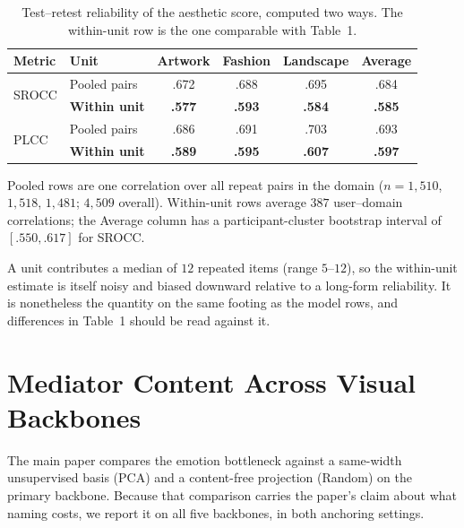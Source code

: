 \begin{table}[t]
\centering
\begin{threeparttable}
\caption{Test--retest reliability of the aesthetic score, computed two ways.
The within-unit row is the one comparable with Table~1.}
\label{tab:retest_units}
\small
\setlength{\tabcolsep}{4.5pt}
\begin{tabular}{llcccc}
\toprule
Metric & Unit & Artwork & Fashion & Landscape & Average \\
\midrule
\multirow{2}{*}{SROCC}
 & Pooled pairs      & .672 & .688 & .695 & .684 \\
 & \textbf{Within unit} & \textbf{.577} & \textbf{.593} & \textbf{.584} & \textbf{.585} \\
\midrule
\multirow{2}{*}{PLCC}
 & Pooled pairs      & .686 & .691 & .703 & .693 \\
 & \textbf{Within unit} & \textbf{.589} & \textbf{.595} & \textbf{.607} & \textbf{.597} \\
\bottomrule
\end{tabular}
\begin{tablenotes}[flushleft]\footnotesize
\item Pooled rows are one correlation over all repeat pairs in the domain
($n=1{,}510$, $1{,}518$, $1{,}481$; $4{,}509$ overall). Within-unit rows average
$387$ user--domain correlations; the Average column has a participant-cluster
bootstrap interval of $[.550,.617]$ for SROCC.
\item A unit contributes a median of $12$ repeated items (range $5$--$12$), so
the within-unit estimate is itself noisy and biased downward relative to a
long-form reliability. It is nonetheless the quantity on the same footing as
the model rows, and differences in Table~1 should be read against it.
\end{tablenotes}
\end{threeparttable}
\end{table}


\section{Mediator Content Across Visual Backbones}
\label{sec:supp_mediator_backbone}

The main paper compares the emotion bottleneck against a same-width
unsupervised basis (PCA) and a content-free projection (Random) on the primary
backbone. Because that comparison carries the paper's claim about what naming
costs, we report it on all five backbones, in both anchoring settings.

